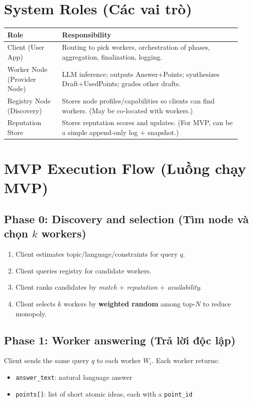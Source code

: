 \documentclass[11pt]{article}
\begin{document}
\section{System Roles (Các vai trò)}
\begin{longtable}{@{}p{0.22\linewidth}p{0.72\linewidth}@{}}
\toprule
\textbf{Role} & \textbf{Responsibility} \\
\midrule
Client (User App) &
Routing to pick workers, orchestration of phases, aggregation, finalization, logging. \\
Worker Node (Provider Node) &
LLM inference; outputs Answer+Points; synthesizes Draft+UsedPoints; grades other drafts. \\
Registry Node (Discovery) &
Stores node profiles/capabilities so clients can find workers. (May be co-located with workers.) \\
Reputation Store &
Stores reputation scores and updates. (For MVP, can be a simple append-only log + snapshot.) \\
\bottomrule
\end{longtable}

\section{MVP Execution Flow (Luồng chạy MVP)}
\subsection{Phase 0: Discovery and selection (Tìm node và chọn \(k\) workers)}
\begin{enumerate}[leftmargin=1.2em]
  \item Client estimates topic/language/constraints for query \(q\).
  \item Client queries registry for candidate workers.
  \item Client ranks candidates by \textit{match} + \textit{reputation} + \textit{availability}.
  \item Client selects \(k\) workers by \textbf{weighted random} among top-\(N\) to reduce monopoly.
\end{enumerate}

\subsection{Phase 1: Worker answering (Trả lời độc lập)}
Client sends the same query \(q\) to each worker \(W_i\).
Each worker returns:
\begin{itemize}[leftmargin=1.2em]
  \item \texttt{answer\_text}: natural language answer
  \item \texttt{points[]}: list of short atomic ideas, each with a \texttt{point\_id}
\end{itemize}
\end{document}
